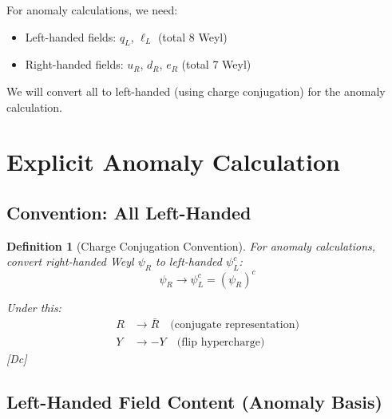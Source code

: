 \documentclass[11pt,a4paper]{article}
\newtheorem{definition}[theorem]{Definition}
\newcommand{\tagDc}{\textcolor{blue!50!black}{[Dc]}}
\begin{document}
For anomaly calculations, we need:
\begin{itemize}
    \item Left-handed fields: $q_L$, $\ell_L$ (total 8 Weyl)
    \item Right-handed fields: $u_R$, $d_R$, $e_R$ (total 7 Weyl)
\end{itemize}

We will convert all to left-handed (using charge conjugation) for the anomaly calculation.

\section{Explicit Anomaly Calculation}
\label{sec:anomaly}

\subsection{Convention: All Left-Handed}

\begin{definition}[Charge Conjugation Convention]
\label{def:charge-conj}
For anomaly calculations, convert right-handed Weyl $\psi_R$ to left-handed $\psi_L^c$:
\begin{equation}
\label{eq:charge-conj}
\psi_R \to \psi_L^c = (\psi_R)^c
\end{equation}

Under this:
\begin{align}
\label{eq:conj-rep}
R &\to \bar{R} \quad \text{(conjugate representation)} \\
\label{eq:conj-Y}
Y &\to -Y \quad \text{(flip hypercharge)}
\end{align}
\tagDc
\end{definition}

\subsection{Left-Handed Field Content (Anomaly Basis)}
\end{document}
